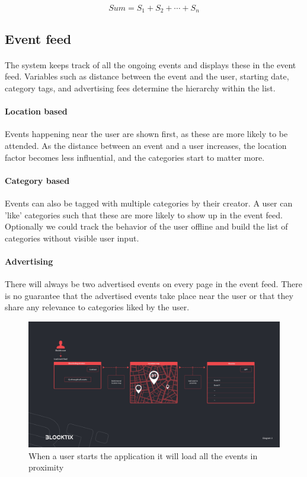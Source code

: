 \documentclass[a4paper]{article}
\begin{document}
\[Sum = S_1 + S_2 + \cdots + S_n\]

\subsection{Event feed}
\paragraph{}The system keeps track of all the ongoing events and displays these in the event feed. Variables such as distance between the event and the user, starting date, category tags, and advertising fees determine the hierarchy within the list. 

\paragraph{Location based} Events happening near the user are shown first, as these are more likely to be attended. As the distance between an event and a user increases, the location factor becomes less influential, and the categories start to matter more.

\paragraph{Category based}Events can also be tagged with multiple categories by their creator. A user can 'like' categories such that these are more likely to show up in the event feed. Optionally we could track the behavior of the user offline and build the list of categories without visible user input.


\paragraph{Advertising} There will always be two advertised events on every page in the event feed. There is no guarantee that the advertised events take place near the user or that they share any relevance to categories liked by the user.

\begin{figure}
\centering
\includegraphics[scale=0.22]{BTX-Diagram-3.jpg}
\caption{\label{fig:BTX-Diagram-3}When a user starts the application it will load all the events in proximity}
\end{figure}
\end{document}
